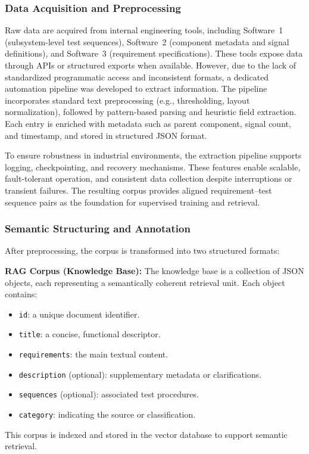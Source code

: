 \documentclass[a4paper,fleqn]{cas-dc}
\renewcommand{\textit}[1]{#1}
\begin{document}
\subsubsection{Data Acquisition and Preprocessing} 
Raw data are acquired from internal engineering tools, including \textit{Software~1} (subsystem-level test sequences), \textit{Software~2} (component metadata and signal definitions), and \textit{Software~3} (requirement specifications). These tools expose data through APIs or structured exports when available. However, due to the lack of standardized programmatic access and inconsistent formats, a dedicated automation pipeline was developed to extract information. The pipeline incorporates standard text preprocessing (e.g., thresholding, layout normalization), followed by pattern-based parsing and heuristic field extraction. Each entry is enriched with metadata such as parent component, signal count, and timestamp, and stored in structured JSON format. 

To ensure robustness in industrial environments, the extraction pipeline supports logging, checkpointing, and recovery mechanisms. These features enable scalable, fault-tolerant operation, and consistent data collection despite interruptions or transient failures. The resulting corpus provides aligned requirement–test sequence pairs as the foundation for supervised training and retrieval.

\subsubsection{Semantic Structuring and Annotation} 
After preprocessing, the corpus is transformed into two structured formats:

\textbf{RAG Corpus (Knowledge Base):} 
    The knowledge base is a collection of JSON objects, each representing a semantically coherent retrieval unit.  
    Each object contains:
    \begin{itemize}
        \item \texttt{id}: a unique document identifier.
        \item \texttt{title}: a concise, functional descriptor.
        \item \texttt{requirements}: the main textual content.
        \item \texttt{description} (optional): supplementary metadata or clarifications.
        \item \texttt{sequences} (optional): associated test procedures.
        \item \texttt{category}: indicating the source or classification.
    \end{itemize}
    This corpus is indexed and stored in the vector database to support semantic retrieval.
\end{document}
